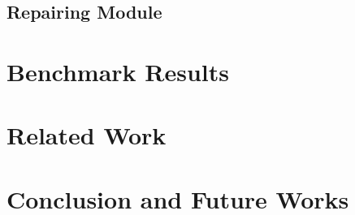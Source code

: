 \documentclass{sigplanconf}
\begin{document}
\subsection{Repairing Module}
\label{subsec:RepairingModule}




\section{Benchmark Results}
\label{sec:bench}

\section{Related Work}
\label{sec:rel}

\section{Conclusion and Future Works}
\label{sec:conc}


\acks










\end{document}
